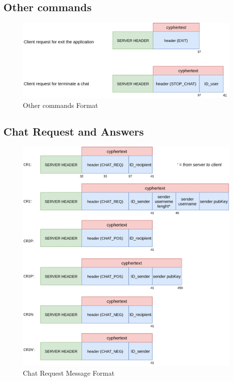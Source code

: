 \documentclass[11pt]{report}
\begin{document}
\subsection*{Other commands}
\begin{figure}[H]
	\centering
	\includegraphics[scale=0.28]{img/OthersCommandsFormat.png}
	\caption{Other commands Format}
	\label {img: FormatOtherCommands}
\end{figure}
\subsection*{Chat Request and Answers}
\begin{figure}[H]
	\centering
	\includegraphics[scale=0.28]{img/ChatRequest_messageFormat.png}
	\caption{Chat Request Message Format}
	\label {img: FormatChatRequest}
\end{figure}
\newpage
\end{document}
